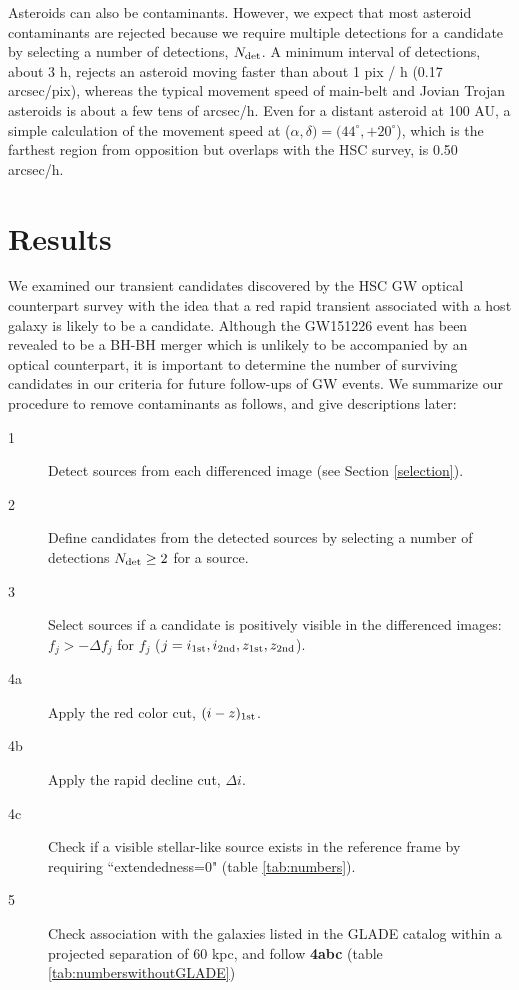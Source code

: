 \documentclass[]{pasj01}
\begin{document}
Asteroids can also be contaminants.
However, we expect that most  asteroid contaminants are rejected
because we require multiple detections for a candidate by selecting a number of detections, $N_{\rm det}$.
A minimum interval of detections, about 3 h, rejects an asteroid moving faster than about  1 pix / h (0.17 arcsec/pix),
whereas the typical movement speed of main-belt and Jovian Trojan asteroids is about a few tens of arcsec/h.
Even for a distant asteroid at 100 AU, a simple calculation of the movement speed at ($\alpha, \delta)=(44^{\circ}, +20^{\circ}$), which is the farthest region from opposition but overlaps with the HSC survey, is 0.50 arcsec/h.

\section{Results}

We examined our transient candidates discovered by the HSC GW optical counterpart survey
with the idea that a red rapid transient associated with a host galaxy is likely to be a candidate.
Although the GW151226 event has been revealed to be a BH-BH merger which is unlikely to be accompanied by an optical counterpart,
it is important to determine the number of surviving candidates in our criteria for  future follow-ups of GW events.
 We summarize our procedure to remove contaminants as follows,  and give descriptions later:

\begin{description}
\item[1] Detect sources from each differenced image (see Section \ref{selection}).
\item[2] Define candidates from the detected sources by selecting a number of detections $N_{\rm det}\geq2$ for a source.
\item[3] Select sources if a candidate is positively visible in the differenced images: $f_{j}>-\Delta f_{j}$ for $f_{j}$  ($j=i_{\rm 1st}, i_{\rm 2nd}, z_{\rm 1st}, z_{\rm 2nd}$).
\item[4a] Apply the red color cut, $(i-z)_{\rm 1st}$.
\item[4b] Apply the rapid decline cut, $\Delta i$.
\item[4c] Check if a visible stellar-like source exists in the reference frame by requiring ``extendedness=0" (table \ref{tab:numbers}).
\item[5] Check association with the galaxies listed in the GLADE catalog within a projected separation of 60 kpc, and follow {\bf 4abc} (table \ref{tab:numberswithoutGLADE})
\end{description}
\end{document}
